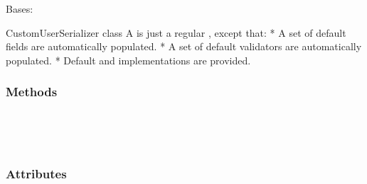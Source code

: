 \documentclass[letterpaper,10pt,english]{sphinxmanual}
\begin{document}
\begin{fulllineitems}
\label{\detokenize{vtcvlp:vtcuser.serializers.CustomUserSerializer}}
Bases: 

CustomUserSerializer class
A  is just a regular , except that:
* A set of default fields are automatically populated.
* A set of default validators are automatically populated.
* Default  and  implementations are provided.
\subsubsection*{Methods}


\begin{savenotes}\sphinxatlongtablestart\begin{longtable}[c]{}
\hline

\endfirsthead

%
{}\\
\hline

\endhead

\hline
{}\\
\endfoot

\endlastfoot

\end{longtable}\sphinxatlongtableend\end{savenotes}
\subsubsection*{Attributes}


\begin{savenotes}\sphinxatlongtablestart\begin{longtable}[c]{}
\hline

\endfirsthead

%
{}\\
\hline


\end{longtable}
\end{savenotes}
\end{fulllineitems}
\end{document}
